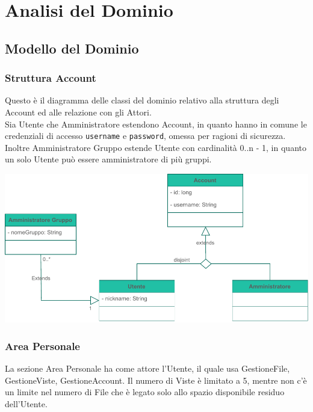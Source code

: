 \section*{Analisi del Dominio}
{}

\subsection*{Modello del Dominio}

\subsubsection*{Struttura Account}
{}
\vspace{0.5cm}
Questo è il diagramma delle classi del dominio relativo alla struttura degli Account ed alle relazione con gli Attori. \\
Sia Utente che Amministratore estendono Account, in quanto hanno in comune le credenziali di accesso \verb|username| e \verb|password|, omessa per ragioni di sicurezza.\\
Inoltre Amministratore Gruppo estende Utente con cardinalità 0..n - 1, in quanto un solo Utente può essere amministratore di più gruppi.

\vspace{0.5cm}
\begin{adjustwidth}{-2cm}{0cm}
\includegraphics[scale=1]{dominio/Dominio-Struttura Account.drawio.pdf}
\end{adjustwidth}

\pagebreak
\subsubsection*{Area Personale}
{}
\vspace{0.5cm}
La sezione Area Personale ha come attore l'Utente, il quale usa GestioneFile, GestioneViste, GestioneAccount. Il numero di Viste è limitato a 5, mentre non c'è un limite nel numero di File che è legato solo allo spazio disponibile residuo dell'Utente.
\vspace{0.5cm}

